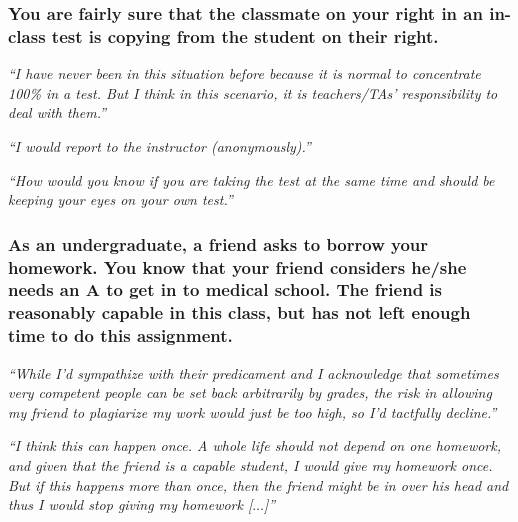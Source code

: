 \documentclass[12pt]{beamer}
\newcommand\ans[1]{{\it ``#1''}}
\newcommand\gap{\vspace{5mm}}
\begin{document}
\begin{frame} %

\frametitle{You are fairly sure that the classmate on your right in an in-class test is copying from the student on their right.}

\ans{I have never been in this situation before because it is normal to concentrate 100\% in a test.  But I think in this scenario, it is teachers/TAs’ responsibility to deal with them.}

\gap

\ans{I would report to the instructor (anonymously).}

\gap

\ans{How would you know if you are taking the test at the same time and should be keeping your eyes on your own test.}







\end{frame}

\begin{frame}   %

  \frametitle{As an undergraduate, a friend asks to borrow your homework. You know that your friend considers he/she needs an A to get in to medical school. The friend is reasonably capable in this class, but has not left enough time to do this assignment.}
  
\ans{While I’d sympathize with their predicament and I acknowledge that sometimes very competent people can be set back arbitrarily by grades, the risk in allowing my friend to plagiarize my work would just be too high, so I’d tactfully decline.}

\gap

\ans{I think this can happen once.  A whole life should not depend on one homework, and given that the friend is a capable student, I would give my homework once.  But if this happens more than once, then the friend might be in over his head and thus I would stop giving my homework [$\dots$]}

\end{frame}
\end{document}

